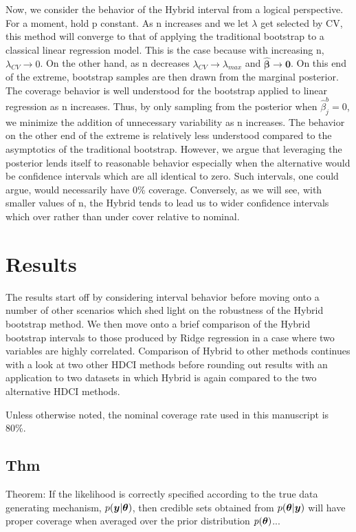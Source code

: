 Now, we consider the behavior of the Hybrid interval from a logical perspective. For a moment, hold p constant. As n increases and we let $\lambda$ get selected by CV, this method will converge to that of applying the traditional bootstrap to a classical linear regression model. This is the case because with increasing n, $\lambda_{CV} \rightarrow 0$. On the other hand, as n decreases $\lambda_{CV} \rightarrow \lambda_{max}$ and $\hat{\boldsymbol{\beta}}\rightarrow \boldsymbol{0}$. On this end of the extreme, bootstrap samples are then drawn from the marginal posterior. The coverage behavior is well understood for the bootstrap applied to linear regression as n increases. Thus, by only sampling from the posterior when $\hat{\beta}_j^b = 0$, we minimize the addition of unnecessary variability as n increases. The behavior on the other end of the extreme is relatively less understood compared to the asymptotics of the traditional bootstrap. However, we argue that leveraging the posterior lends itself to reasonable behavior especially when the alternative would be confidence intervals which are all identical to zero. Such intervals, one could argue, would necessarily have 0\% coverage. Conversely, as we will see, with smaller values of n, the Hybrid tends to lead us to wider confidence intervals which over rather than under cover relative to nominal.

\section{Results}

The results start off by considering interval behavior before moving onto a number of other scenarios which shed light on the robustness of the Hybrid bootstrap method. We then move onto a brief comparison of the Hybrid bootstrap intervals to those produced by Ridge regression in a case where two variables are highly correlated. Comparison of Hybrid to other methods continues with a look at two other HDCI methods before rounding out results with an application to two datasets in which Hybrid is again compared to the two alternative HDCI methods.

Unless otherwise noted, the nominal coverage rate used in this manuscript is 80\%.

\subsection{Thm}


Theorem: If the likelihood is correctly specified according to the true data generating mechanism, $p(\boldsymbol{y} | \boldsymbol{\theta})$, then credible sets obtained from $p(\boldsymbol{\theta}|\boldsymbol{y})$ will have proper coverage when averaged over the prior distribution $p(\boldsymbol{\theta})$... 

